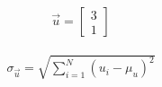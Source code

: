 \documentclass[12pt]{article}
\begin{document}
\begin{align*}
  \vec{u} = \begin{bmatrix}
      3\\1
  \end{bmatrix}
\end{align*}

\begin{align*}
  \sigma_{\vec{u}} = \sqrt{\sum_{i=1}^N (u_i - \mu_u)^2}
\end{align*}
\end{document}

